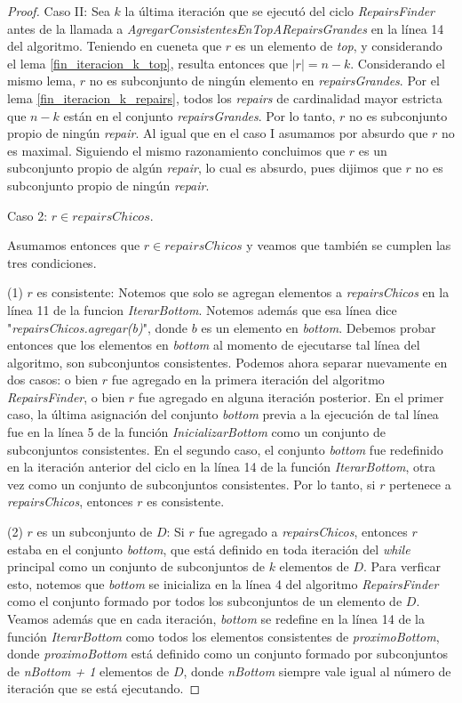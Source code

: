 \documentclass[11pt,a4paper,twoside]{tesis}
\begin{document}
\begin{proof}
Caso II: Sea $k$ la última iteración que se ejecutó del ciclo \textit{RepairsFinder} antes de la llamada a \textit{AgregarConsistentesEnTopARepairsGrandes} en la línea 14 del algoritmo. Teniendo en cueneta que $r$ es un elemento de \textit{top}, y considerando el lema \ref{fin_iteracion_k_top}, resulta entonces que $|r| = n - k$. Considerando el mismo lema, $r$ no es subconjunto de ningún elemento en \textit{repairsGrandes}.
Por el lema \ref{fin_iteracion_k_repairs}, todos los \textit{repairs} de cardinalidad mayor estricta que $n - k$ están en el conjunto \textit{repairsGrandes}. Por lo tanto, $r$ no es subconjunto propio de ningún \textit{repair}. Al igual que en el caso I asumamos por absurdo que $r$ no es maximal. Siguiendo el mismo razonamiento concluimos que $r$ es un subconjunto propio de algún \textit{repair}, lo cual es absurdo, pues dijimos que $r$ no es  subconjunto propio de ningún \textit{repair}.

\begin{center}
Caso 2: $r \in repairsChicos$.
\end{center}

Asumamos entonces que $r \in repairsChicos$ y veamos que también se cumplen las tres condiciones.

(1) $r$ es consistente: Notemos que solo se agregan elementos a \textit{repairsChicos} en la línea 11 de la funcion \textit{IterarBottom}. Notemos además que esa línea dice "\textit{repairsChicos.agregar(b)}", donde $b$ es un elemento en \textit{bottom}. Debemos probar entonces que los elementos en \textit{bottom} al momento de ejecutarse tal línea del algoritmo, son subconjuntos consistentes. Podemos ahora separar nuevamente en dos casos: o bien $r$ fue agregado en la primera iteración del algoritmo \textit{RepairsFinder}, o bien $r$ fue agregado en alguna iteración posterior. En el primer caso, la última asignación del conjunto \textit{bottom} previa a la ejecución de tal línea fue en la línea 5 de la función \textit{InicializarBottom} como un conjunto de subconjuntos consistentes. En el segundo caso, el conjunto \textit{bottom} fue redefinido en la iteración anterior del ciclo en la línea 14 de la función \textit{IterarBottom}, otra vez como un conjunto de subconjuntos consistentes. Por lo tanto, si $r$ pertenece a \textit{repairsChicos}, entonces $r$ es consistente.

(2) $r$ es un subconjunto de $D$: Si $r$ fue agregado a \textit{repairsChicos}, entonces $r$ estaba en el conjunto \textit{bottom}, que está definido en toda iteración del \textit{while} principal como un conjunto de subconjuntos de $k$ elementos de $D$. Para verficar esto, notemos que \textit{bottom} se inicializa en la línea 4 del algoritmo \textit{RepairsFinder} como el conjunto formado por todos los subconjuntos de un elemento de $D$. Veamos además que en cada iteración, \textit{bottom} se redefine en la línea 14 de la función \textit{IterarBottom} como todos los elementos consistentes de \textit{proximoBottom}, donde \textit{proximoBottom} está definido como un conjunto formado por subconjuntos de \textit{nBottom + 1} elementos de $D$, donde \textit{nBottom} siempre vale igual al número de iteración que se está ejecutando.


\end{proof}
\end{document}
